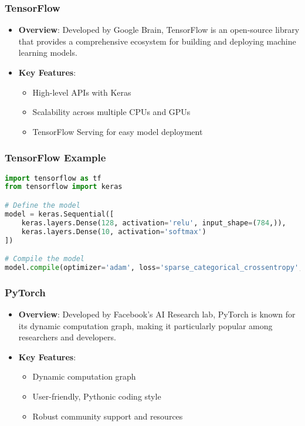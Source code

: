 \documentclass[aspectratio=169]{beamer}
\begin{document}
\begin{frame}
    \frametitle{TensorFlow}
    \begin{itemize}
        \item \textbf{Overview}: Developed by Google Brain, TensorFlow is an open-source library that provides a comprehensive ecosystem for building and deploying machine learning models.
        \item \textbf{Key Features}:
        \begin{itemize}
            \item High-level APIs with Keras
            \item Scalability across multiple CPUs and GPUs
            \item TensorFlow Serving for easy model deployment
        \end{itemize}
    \end{itemize}
\end{frame}

\begin{frame}[fragile]
    \frametitle{TensorFlow Example}
    \begin{lstlisting}[language=Python]
import tensorflow as tf
from tensorflow import keras

# Define the model
model = keras.Sequential([
    keras.layers.Dense(128, activation='relu', input_shape=(784,)),
    keras.layers.Dense(10, activation='softmax')
])

# Compile the model
model.compile(optimizer='adam', loss='sparse_categorical_crossentropy', metrics=['accuracy'])
    \end{lstlisting}
\end{frame}

\begin{frame}
    \frametitle{PyTorch}
    \begin{itemize}
        \item \textbf{Overview}: Developed by Facebook's AI Research lab, PyTorch is known for its dynamic computation graph, making it particularly popular among researchers and developers.
        \item \textbf{Key Features}:
        \begin{itemize}
            \item Dynamic computation graph
            \item User-friendly, Pythonic coding style
            \item Robust community support and resources
        \end{itemize}
    \end{itemize}
\end{frame}
\end{document}
